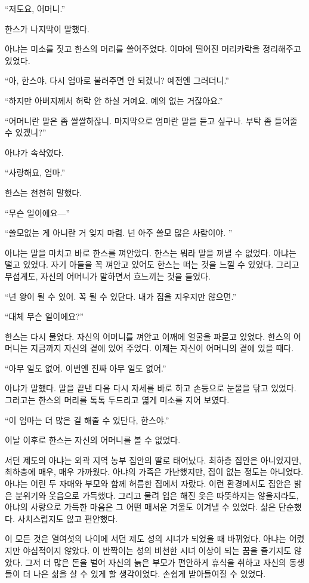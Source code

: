 ``저도요, 어머니.''

한스가 나지막이 말했다.

아냐는 미소를 짓고 한스의 머리를 쓸어주었다. 이마에 떨어진 머리카락을 정리해주고 있었다.

``아, 한스야. 다시 엄마로 불러주면 안 되겠니? 예전엔 그러더니.''

``하지만 아버지께서 허락 안 하실 거예요. 예의 없는 거잖아요.''

``어머니란 말은 좀 쌀쌀하잖니. 마지막으로 엄마란 말을 듣고 싶구나. 부탁 좀 들어줄 수 있겠니?''

아냐가 속삭였다.

``사랑해요, 엄마.''

한스는 천천히 말했다.

``무슨 일이에요—''

``쓸모없는 게 아니란 거 잊지 마렴. 넌 아주 쓸모 많은 사람이야. ''

아냐는 말을 마치고 바로 한스를 껴안았다. 한스는 뭐라 말을 꺼낼 수 없었다. 아냐는 떨고 있었다. 자기 아들을 꼭 껴안고 있어도 한스는 떠는 것을 느낄 수 있었다. 그리고 무섭게도, 자신의 어머니가 말하면서 흐느끼는 것을 들었다.

``넌 왕이 될 수 있어. 꼭 될 수 있단다. 내가 짐을 지우지만 않으면.''

``대체 무슨 일이에요?''

한스는 다시 물었다. 자신의 어머니를 껴안고 어깨에 얼굴을 파묻고 있었다. 한스의 어머니는 지금까지 자신의 곁에 있어 주었다. 이제는 자신이 어머니의 곁에 있을 때다.

``아무 일도 없어. 이번엔 진짜 아무 일도 없어.''

아냐가 말했다. 말을 끝낸 다음 다시 자세를 바로 하고 손등으로 눈물을 닦고 있었다. 그러고는 한스의 머리를 톡톡 두드리고 엷게 미소를 지어 보였다.

``이 엄마는 더 많은 걸 해줄 수 있단다, 한스야.''

이날 이후로 한스는 자신의 어머니를 볼 수 없었다.

\textbreak

서던 제도의 아냐는 외곽 지역 농부 집안의 딸로 태어났다. 최하층 집안은 아니었지만, 최하층에 매우, 매우 가까웠다. 아냐의 가족은 가난했지만, 집이 없는 정도는 아니었다. 아냐는 어린 두 자매와 부모와 함께 허름한 집에서 자랐다. 이런 환경에서도 집안은 밝은 분위기와 웃음으로 가득했다. 그리고 물려 입은 해진 옷은 따뜻하지는 않을지라도, 아냐의 사랑으로 가득한 마음은 그 어떤 매서운 겨울도 이겨낼 수 있었다. 삶은 단순했다. 사치스럽지도 않고 편안했다.

이 모든 것은 열여섯의 나이에 서던 제도 성의 시녀가 되었을 때 바뀌었다. 아냐는 어렸지만 야심적이지 않았다. 이 반짝이는 성의 비천한 시녀 이상이 되는 꿈을 즐기지도 않았다. 그저 더 많은 돈을 벌어 자신의 늙은 부모가 편안하게 휴식을 취하고 자신의 동생들이 더 나은 삶을 살 수 있게 할 생각이었다. 손쉽게 받아들여질 수 있었다.

